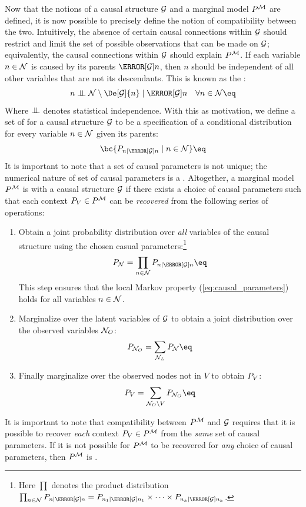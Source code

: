 \documentclass[aps, 10pt, english, twoside, pra, nofootinbib, tightenlines, longbibliography]{revtex4-1}
\begin{document}
    Now that the notions of a causal structure $\mathcal{G}$ and a marginal model $\prob^{\mscenario}$ are defined, it is now possible to precisely define the notion of compatibility between the two. Intuitively, the absence of certain causal connections within $\mathcal{G}$ should restrict and limit the set of possible observations that can be made on $\mathcal{G}$; equivalently, the causal connections within $\mathcal{G}$ should explain $\prob^{\mscenario}$. If each variable $n \in \mathcal{N}$ is caused by its parents $\Pa[\graph]{n}$, then $n$ should be independent of all other variables that are not its descendants. This is known as the :
    \[ n \indep \nodes \setminus \De[\graph]{n} \mid \Pa[\graph]{n} \quad \forall n \in \nodes \eq \label{eq:local_markov_property} \]
    Where $\perp\!\!\!\perp$ denotes statistical independence. With this as motivation, we define a set of  for a causal structure $\mathcal{G}$ to be a specification of a conditional distribution for every variable $n \in \mathcal{N}$ given its parents:
    \[ \bc{\prob[n \mid \Pa[\graph]{n}] \mid n \in \nodes} \eq \label{eq:causal_parameters} \]
    It is important to note that a set of causal parameters is not unique; the numerical nature of set of causal parameters is a . Altogether, a marginal model $\prob^{\mscenario}$ is  with a causal structure $\mathcal{G}$ if there exists a choice of causal parameters such that each context $\prob[V] \in \prob^{\mscenario}$ can be \textit{recovered} from the following series of operations:
    \begin{enumerate}
        \item Obtain a joint probability distribution over \textit{all} variables of the causal structure using the chosen casual parameters:\footnote{Here $\prod$ denotes the product distribution $\prod_{n \in \nodes} \prob[n \mid \Pa[\graph]{n}] = \prob[n_1 \mid \Pa[\graph]{n_1}] \times \cdots \times \prob[n_k \mid \Pa[\graph]{n_k}]$.}
        \[ \prob[\nodes] = \prod_{n \in \nodes} \prob[n \mid \Pa[\graph]{n}] \eq \label{eq:local_markov_property_operation}\]
        This step ensures that the local Markov property (\cref{eq:causal_parameters}) holds for all variables $n \in \mathcal{N}$.
        \item Marginalize over the latent variables of $\mathcal{G}$ to obtain a joint distribution over the observed variables $\mathcal{N}_O$:
        \[ \prob[\nodes_O] = \sum_{\nodes_L} \prob[\nodes] \eq \label{eq:observable_marginalization} \]
        \item Finally marginalize over the observed nodes not in $V$ to obtain $\prob[V]$:
        \[ \prob[V] = \sum_{\nodes_O \setminus V} \prob[\nodes_O] \eq \label{eq:context_marginalization} \]
    \end{enumerate}
    It is important to note that compatibility between $\prob^{\mscenario}$ and $\mathcal{G}$ requires that it is possible to recover \textit{each} context $\prob[V] \in \prob^{\mscenario}$ from the \textit{same} set of causal parameters. If it is not possible for $\prob^{\mscenario}$ to be recovered for \textit{any} choice of causal parameters, then $\prob^{\mscenario}$ is .
\end{document}
